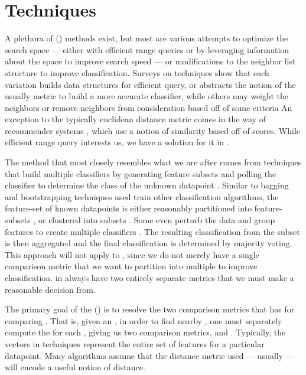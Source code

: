 \section{\kNN{} Techniques}
A plethora of \kNNlong{} (\kNN{}) methods exist, but most are various attempts to optimize the search space --- either with efficient range queries or by leveraging information about the space to improve search speed --- or modifications to the neighbor list structure to improve classification.
Surveys on \kNN{} techniques \cite{DBLP:journals/corr/abs-1007-0085, DBLP:conf/fskd/JiangCWJ07} show that each variation builds data structures for efficient query, or abstracts the notion of the usually \euclid{} metric to build a more accurate classifier, while others may weight the neighbors or remove neighbors from consideration based off of some criteria
An exception to the typically euclidean distance metric comes in the way of recommender systems \cite{DBLP:reference/rsh/DesrosiersK11, DBLP:reference/sp/NingDK15}, which use a notion of similarity based off of scores.
While efficient range query interests us, we have a solution for it in \cite{johnson2015density}.

The method that most closely resembles what we are after comes from techniques that build multiple \kNN{} classifiers by generating feature subsets and polling the classifier to determine the class of the unknown datapoint \cite{DBLP:conf/icml/Bay98, DBLP:journals/ida/Bay99, DBLP:conf/icmlc/WangHWC05}.
Similar to bagging and bootstrapping techniques used train other classification algorithms, the feature-set of known datapoints is either reasonably partitioned into feature-subsets \cite{DBLP:conf/icml/Bay98, DBLP:journals/ida/Bay99}, or clustered into subsets \cite{DBLP:conf/icmlc/WangHWC05}.
Some even perturb the data and group features to create multiple \kNN{} classifiers \cite{DBLP:conf/icmlc/Juan10}.
The resulting classification from the \kNN{} subset is then aggregated and the final classification is determined by majority voting.
This approach will not apply to \cplop{}, since we do not merely have a single comparison metric that we want to partition into multiple to improve classification.
\Isols{} in \cplop{} always have two entirely separate metrics that we must make a reasonable decision from.

The primary goal of the \krapmed{} (\krap{}) is to resolve the two comparison metrics that \cplop{} has for comparing \isols{}.
That is, given an \isol{}, in order to find nearby \isols{}, one must separately compute the \pearson{} \pcfunclabel{} for each \itsshort{}, giving us two comparison metrics, \pcsixt{} and \pcfive{}.
Typically, the vectors in \kNN{} techniques represent the entire set of features for a particular datapoint.
Many \kNN{} algorithms assume that the distance metric used --- usually \euclid{} --- will encode a useful notion of distance.

